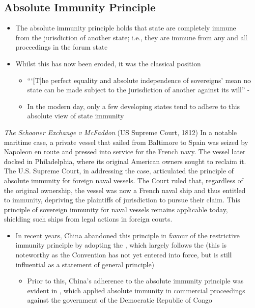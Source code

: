\subsection{Absolute Immunity Principle}
\begin{itemize}
    \item The absolute immunity principle holds that state are completely immune from the jurisdiction of another state; i.e., they are immune from any and all proceedings in the forum state
    \item Whilst this has now been eroded, it was the classical position
    \begin{itemize}
        \item ```[T]he perfect equality and absolute independence of sovereigns' mean no state can be made subject to the jurisdiction of another against its will'' - 
        \item In the modern day, only a few developing states tend to adhere to this absolute view of state immunity
    \end{itemize}  
\end{itemize}

\begin{casedetails}{\textit{The Schooner Exchange v McFaddon} (US Supreme Court, 1812)}
    \flushleft
    In a notable maritime case, a private vessel that sailed from Baltimore to Spain was seized by Napoleon en route and pressed into service for the French navy. The vessel later docked in Philadelphia, where its original American owners sought to reclaim it. The U.S. Supreme Court, in addressing the case, articulated the principle of absolute immunity for foreign naval vessels. The Court ruled that, regardless of the original ownership, the vessel was now a French naval ship and thus entitled to immunity, depriving the plaintiffs of jurisdiction to pursue their claim. This principle of sovereign immunity for naval vessels remains applicable today, shielding such ships from legal actions in foreign courts.
\end{casedetails}

\begin{itemize}
    \item In recent years, China abandoned this principle in favour of the restrictive immunity principle by adopting the , which largely follows the  (this is noteworthy as the Convention has not yet entered into force, but is still influential as a statement of general principle)
    \begin{itemize}
        \item Prior to this, China's adherence to the absolute immunity principle was evident in , which applied absolute immunity in commercial proceedings against the government of the Democratic Republic of Congo
    \end{itemize}
\end{itemize}

